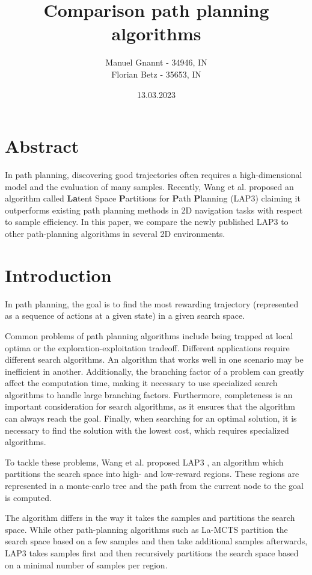 \documentclass[bibliography=totoc]{scrartcl}
\title{Comparison path planning algorithms}
\author{Manuel Gnannt - 34946, IN \\ Florian Betz - 35653, IN}
\date{13.03.2023}%
\begin{document}
\maketitle
\tableofcontents

\clearpage
\section{Abstract}
In path planning, discovering good trajectories often requires a high-dimensional model and the evaluation of many samples. Recently, Wang et al. proposed an algorithm called \textbf{La}tent Space \textbf{P}artitions for \textbf{P}ath \textbf{P}lanning (LAP3) claiming it outperforms existing path planning methods in 2D navigation tasks with respect to sample efficiency. In this paper, we compare the newly published LAP3 to other path-planning algorithms in several 2D environments.

\section{Introduction}
In path planning, the goal is to find the most rewarding trajectory (represented as a sequence of actions at a given state) in a given search space.

Common problems of path planning algorithms include being trapped at local optima or the exploration-exploitation tradeoff.
Different applications require different search algorithms.
An algorithm that works well in one scenario may be inefficient in another.
Additionally, the branching factor of a problem can greatly affect the computation time, making it necessary to use specialized search algorithms to handle large branching factors.
Furthermore, completeness is an important consideration for search algorithms, as it ensures that the algorithm can always reach the goal.
Finally, when searching for an optimal solution, it is necessary to find the solution with the lowest cost, which requires specialized algorithms.

To tackle these problems, Wang et al. proposed LAP3 \cite{NEURIPS2021_03a3655f}, an algorithm which partitions the search space into high- and low-reward regions. These regions are represented in a monte-carlo tree and the path from the current node to the goal is computed.

The algorithm differs in the way it takes the samples and partitions the search space. While other path-planning algorithms such as La-MCTS \cite{DBLP:journals/corr/abs-2007-00708} partition the search space based on a few samples and then take additional samples afterwards, LAP3 takes samples first and then recursively partitions the search space based on a minimal number of samples per region.
\end{document}
